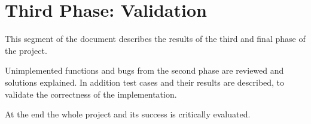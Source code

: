 \section{Third Phase: Validation}
This segment of the document describes the results of the third and final phase of the project.

Unimplemented functions and bugs from the second phase are reviewed and solutions explained. 
In addition test cases and their results are described, to validate the correctness of the implementation.

At the end the whole project and its success is critically evaluated.
